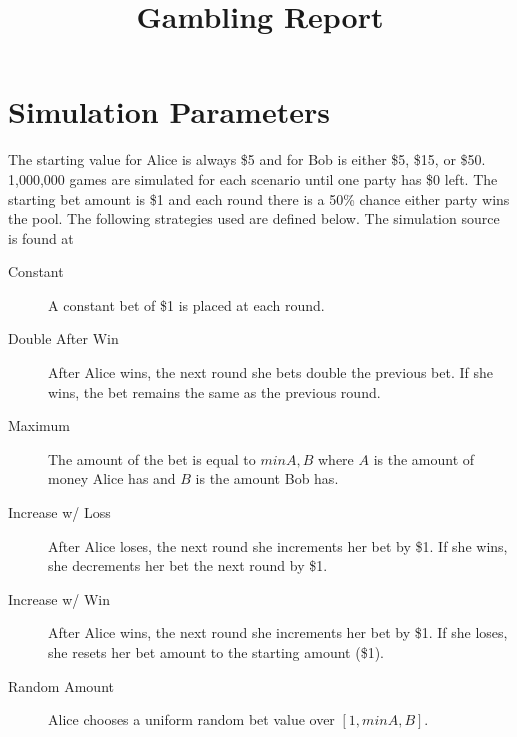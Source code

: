 \documentclass[12pt]{article}
\title{Gambling Report}
\begin{document}
	\maketitle
	\section{Simulation Parameters}
		The starting value for Alice is always \$5 and for Bob is either \$5, \$15, or \$50. 1,000,000 games are simulated for each scenario until one party has \$0 left. The starting bet amount is \$1 and each round there is a 50\% chance either party wins the pool. The following strategies used are defined below. The simulation source is found at \cite{gamblingGit}

		\begin{description}
			\item[Constant]				A constant bet of \$1 is placed at each round.
			\item[Double After Win]		After Alice wins, the next round she bets double the previous bet. If she wins, the bet remains the same as the previous round.
			\item[Maximum]				The amount of the bet is equal to $min{A,B}$ where $A$ is the amount of money Alice has and $B$ is the amount Bob has.
			\item[Increase w/ Loss]		After Alice loses, the next round she increments her bet by \$1. If she wins, she decrements her bet the next round by \$1.
			\item[Increase w/ Win]		After Alice wins, the next round she increments her bet by \$1. If she loses, she resets her bet amount to the starting amount (\$1).
			\item[Random Amount]		Alice chooses a uniform random bet value over $[1, min{A,B}]$.
		\end{description}
\end{document}
